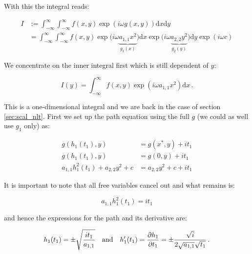 \documentclass[a4paper,10pt]{article}
\begin{document}
With this the integral reads:

\begin{equation}
\begin{split}
 I & := \int_{-\infty}^{\infty} \int_{-\infty}^{\infty} f(x,y) \exp\left(i \omega g(x,y)\right) \mathrm{d}x \mathrm{d}y \\
   &  = \int_{-\infty}^{\infty} \int_{-\infty}^{\infty} f(x,y) \exp\bigl(i \omega
          \underbrace{a_{1,1}x^2}_{g_1(x)}
        \bigr) \mathrm{d}x
        \exp\bigl(i \omega
          \underbrace{a_{2,2}y^2}_{g_2(y)}
        \bigr) \mathrm{d}y
        \exp\left(i \omega c\right)
\end{split}
\end{equation}

We concentrate on the inner integral first which is still dependent of $y$:

\begin{equation}
 I(y) = \int_{-\infty}^{\infty} f(x,y) \exp\left(i \omega a_{1,1}x^2\right) \mathrm{d}x \,.
\end{equation}

This is a one-dimensional integral and we are back in the case of section \ref{sec:scal_nlt}.
First we set up the path equation using the full $g$ (we could as well use $g_1$ only) as:

\begin{equation}
\begin{split}
  g\left( h_1(t_1), y \right)          & = g(x^{*}, y) + i t_1 \\
  g\left( h_1(t_1), y \right)          & = g(0, y) + i t_1 \\
  a_{1,1} h_1^2(t_1) + a_{2,2} y^2 + c & = a_{2,2} y^2 + c + i t_1
\end{split}
\end{equation}

It is important to note that all free variables cancel out and what remains is:

\begin{equation}
 a_{1,1} h_1^2(t_1) = i t_1
\end{equation}

and hence the expressions for the path and its derivative are:

\begin{equation}
 h_1(t_1) = \pm \sqrt{\frac{i t_1}{a_{1,1}}}
 \quad \mathrm{and} \quad
 h_1^{\prime}(t_1) = \frac{\partial h_1}{\partial t_1} = \pm \frac{\sqrt{i}}{2\sqrt{a_{1,1}}\sqrt{t_1}} \,.
\end{equation}
\end{document}
